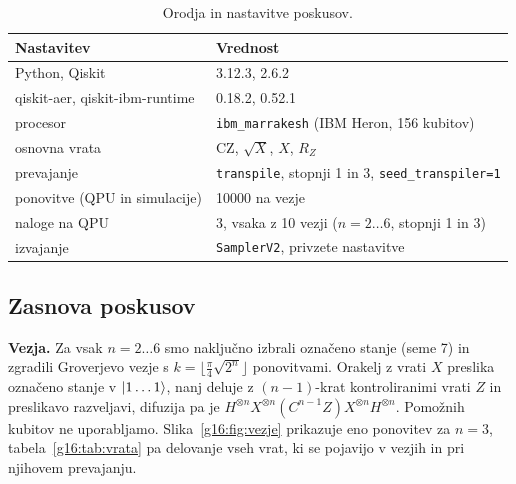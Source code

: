 \begin{table}[htbp]
\caption{Orodja in nastavitve poskusov.}
\label{g16:tab:orodja}
\centering
\begin{tabular}{ll}
\toprule
Nastavitev & Vrednost \\
\midrule
Python, Qiskit & 3.12.3, 2.6.2 \\
qiskit-aer, qiskit-ibm-runtime & 0.18.2, 0.52.1 \\
procesor & \texttt{ibm\_marrakesh} (IBM Heron, 156 kubitov) \\
osnovna vrata & CZ, $\sqrt{X}$, $X$, $R_Z$ \\
prevajanje & \texttt{transpile}, stopnji 1 in 3, \texttt{seed\_transpiler=1} \\
ponovitve (QPU in simulacije) & \num{10000} na vezje \\
naloge na QPU & 3, vsaka z 10 vezji ($n = 2 \ldots 6$, stopnji 1 in 3) \\
izvajanje & \texttt{SamplerV2}, privzete nastavitve \\
\bottomrule
\end{tabular}
\end{table}

\subsection{Zasnova poskusov}
\label{g16:sec:poskusi}

\textbf{Vezja.} Za vsak $n = 2 \ldots 6$ smo naključno izbrali označeno stanje (seme 7) in zgradili Groverjevo vezje s $k = \lfloor \frac{\pi}{4}\sqrt{2^n} \rfloor$ ponovitvami. Orakelj z vrati $X$ preslika označeno stanje v $\ket{1\ldots1}$, nanj deluje z $(n-1)$-krat kontroliranimi vrati $Z$ in preslikavo razveljavi, difuzija pa je $H^{\otimes n} X^{\otimes n} (C^{n-1}Z) X^{\otimes n} H^{\otimes n}$. Pomožnih kubitov ne uporabljamo. Slika~\ref{g16:fig:vezje} prikazuje eno ponovitev za $n = 3$, tabela~\ref{g16:tab:vrata} pa delovanje vseh vrat, ki se pojavijo v vezjih in pri njihovem prevajanju.

